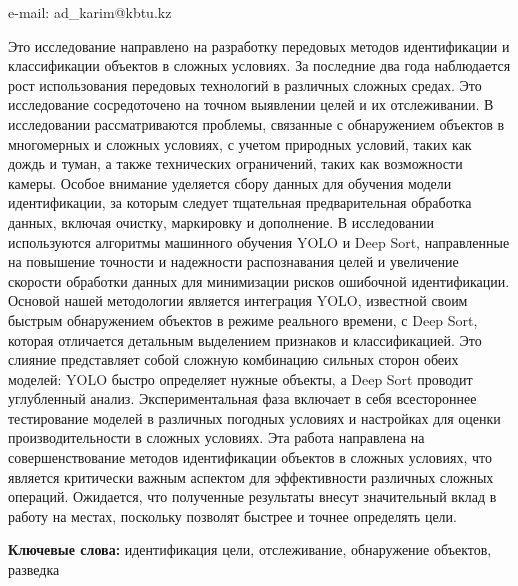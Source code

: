 e-mail: ad\_karim@kbtu.kz

Это исследование направлено на разработку передовых методов
идентификации и классификации объектов в сложных условиях. За последние
два года наблюдается рост использования передовых технологий в различных
сложных средах. Это исследование сосредоточено на точном выявлении целей
и их отслеживании. В исследовании рассматриваются проблемы, связанные с
обнаружением объектов в многомерных и сложных условиях, с учетом
природных условий, таких как дождь и туман, а также технических
ограничений, таких как возможности камеры. Особое внимание уделяется
сбору данных для обучения модели идентификации, за которым следует
тщательная предварительная обработка данных, включая очистку, маркировку
и дополнение. В исследовании используются алгоритмы машинного обучения
YOLO и Deep Sort, направленные на повышение точности и надежности
распознавания целей и увеличение скорости обработки данных для
минимизации рисков ошибочной идентификации. Основой нашей методологии
является интеграция YOLO, известной своим быстрым обнаружением объектов
в режиме реального времени, с Deep Sort, которая отличается детальным
выделением признаков и классификацией. Это слияние представляет собой
сложную комбинацию сильных сторон обеих моделей: YOLO быстро определяет
нужные объекты, а Deep Sort проводит углубленный анализ.
Экспериментальная фаза включает в себя всестороннее тестирование моделей
в различных погодных условиях и настройках для оценки производительности
в сложных условиях. Эта работа направлена на совершенствование методов
идентификации объектов в сложных условиях, что является критически
важным аспектом для эффективности различных сложных операций. Ожидается,
что полученные результаты внесут значительный вклад в работу на местах,
поскольку позволят быстрее и точнее определять цели.

\textbf{Ключевые слова:} идентификация цели, отслеживание, обнаружение
объектов, разведка

